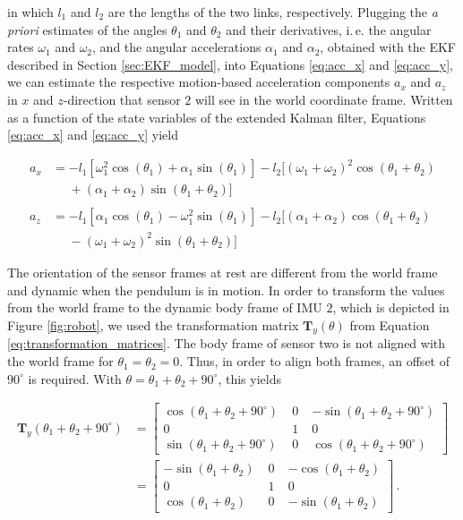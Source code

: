 \noindent
in which $l_1$ and $l_2$ are the lengths of the two links, respectively. Plugging the \emph{a priori} estimates of the angles $\theta_1$ and $\theta_2$ and their derivatives, i.\,e. the angular rates $\omega_1$ and $\omega_2$, and the angular accelerations $\alpha_1$ and $\alpha_2$, obtained with the EKF described in Section \ref{sec:EKF_model}, into Equations \ref{eq:acc_x} and \ref{eq:acc_y}, we can estimate the respective motion-based acceleration components $a_x$ and $a_z$ in $x$ and $z$-direction that sensor $2$ will see in the world coordinate frame. Written as a function of the state variables of the extended Kalman filter, Equations \ref{eq:acc_x} and \ref{eq:acc_y} yield

\begin{align}
  a_x &= -l_1 [\omega^2_1 \cos(\theta_1) + \alpha_1 \sin(\theta_1)] - l_2 [(\omega_1 + \omega_2)^2 \cos(\theta_1 + \theta_2) \nonumber \\ 
  &\mathrel{\phantom{=}} + (\alpha_1 + \alpha_2) \sin(\theta_1 + \theta_2)] \label{eq:acc_x_state} \\
  \nonumber \\
  a_z {}&= -l_1 [\alpha_1 \cos(\theta_1) - \omega^2_1 \sin(\theta_1)] - l_2 [(\alpha_1 + \alpha_2) \cos(\theta_1 + \theta_2) \nonumber \\ 
  &\mathrel{\phantom{=}} - (\omega_1 + \omega_2)^2 \sin(\theta_1 + \theta_2)] \label{eq:acc_y_state}
\end{align}

The orientation of the sensor frames at rest are different from the world frame and dynamic when the pendulum is in motion. In order to transform the values from the world frame to the dynamic body frame of \gls{IMU} $2$, which is depicted in Figure \ref{fig:robot}, we used the transformation matrix $\mathbf{T}_y(\theta)$ from Equation \ref{eq:transformation_matrices}. The body frame of sensor two is not aligned with the world frame for $\theta_1 = \theta_2 = 0$. Thus, in order to align both frames, an offset of $90^{\circ}$ is required. With $\theta = \theta_1 + \theta_2 + 90^{\circ}$, this yields

\begin{equation}
\begin{split}
\mathbf{T}_y(\theta_1 + \theta_2 + 90^{\circ}) &= \left[ \begin{smallmatrix}
    \cos (\theta_1 + \theta_2 + 90^{\circ}) \; & 0 \; & -\sin (\theta_1 + \theta_2 + 90^{\circ}) \\
    0 \; & 1 \; & 0 \\
    \sin (\theta_1 + \theta_2 + 90^{\circ}) \; & 0 \; & \cos (\theta_1 + \theta_2 + 90^{\circ})
    \end{smallmatrix} \right] \\
    &= \left[ \begin{smallmatrix}
    -\sin (\theta_1 + \theta_2) \; & 0 \; & -\cos (\theta_1 + \theta_2) \\
    0 \; & 1 \; & 0 \\
    \cos (\theta_1 + \theta_2) \; & 0 \; & -\sin (\theta_1 + \theta_2)
    \end{smallmatrix} \right] \,.
\end{split}
\end{equation}

